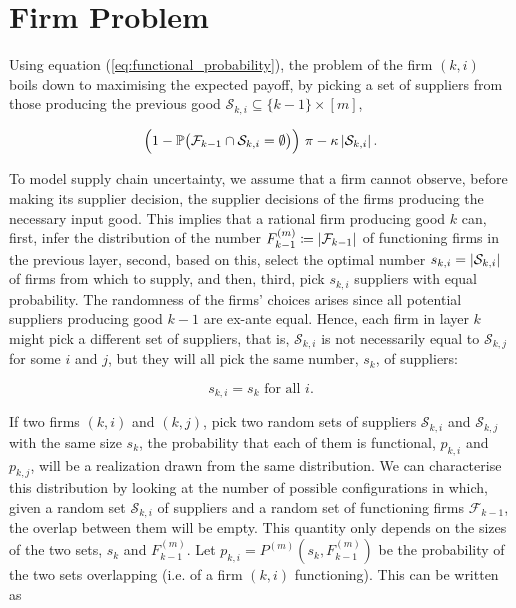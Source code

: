 \documentclass[../../main.tex]{subfiles}
\begin{document}
\section{Firm Problem}

Using equation (\ref{eq:functional_probability}), the problem of the firm $(k, i)$ boils down to maximising the expected payoff, by picking a set of suppliers from those producing the previous good $\mathcal{S}_{k, i} \subseteq \{k - 1\} \times [m]$, 

\begin{equation}
  \Big(1 - \mathbb{P}\big( \mathcal{F}_{k - 1} \cap \mathcal{S}_{k, i} = \emptyset \big) \Big) \ \pi  - \kappa \left\lvert\mathcal{S}_{k, i} \right\rvert.
\end{equation}


To model supply chain uncertainty, we assume that a firm cannot observe, before making its supplier decision, the supplier decisions of the firms producing the necessary input good. This implies that a rational firm producing good $k$ can, first, infer the distribution of the number $F^{(m)}_{k - 1} \coloneqq \left\lvert\mathcal{F}_{k - 1}\right\rvert$ of functioning firms in the previous layer, second, based on this, select the optimal number $s_{k, i} = \left\lvert\mathcal{S}_{k, i}\right\rvert$ of firms from which to supply, and then, third, pick $s_{k, i}$ suppliers with equal probability. The randomness of the firms' choices arises since all potential suppliers producing good $k - 1$ are ex-ante equal. Hence, each firm in layer $k$ might pick a different set of suppliers, that is, $\mathcal{S}_{k, i}$ is not necessarily equal to $\mathcal{S}_{k, j}$ for some $i$ and $j$, but they will all pick the same number, $s_k$, of suppliers:

\begin{equation}
  s_{k, i} = s_k \text{ for all } i.
\end{equation}

If two firms $(k, i)$ and $(k, j)$, pick two random sets of suppliers $\mathcal{S}_{k, i}$ and $\mathcal{S}_{k, j}$ with the same size $s_k$, the probability that each of them is functional, $p_{k, i}$ and $p_{k, j}$, will be a realization drawn from the same distribution. We can characterise this distribution by looking at the number of possible configurations in which, given a random set $\mathcal{S}_{k, i}$ of suppliers and a random set of functioning firms $\mathcal{F}_{k - 1}$, the overlap between them will be empty. This quantity only depends on the sizes of the two sets, $s_k$ and $F^{(m)}_{k-1}$. Let $p_{k, i} = P^{(m)}(s_k, F^{(m)}_{k - 1})$ be the probability of the two sets overlapping (i.e. of a firm $(k, i)$ functioning). This can be written as 
\end{document}
